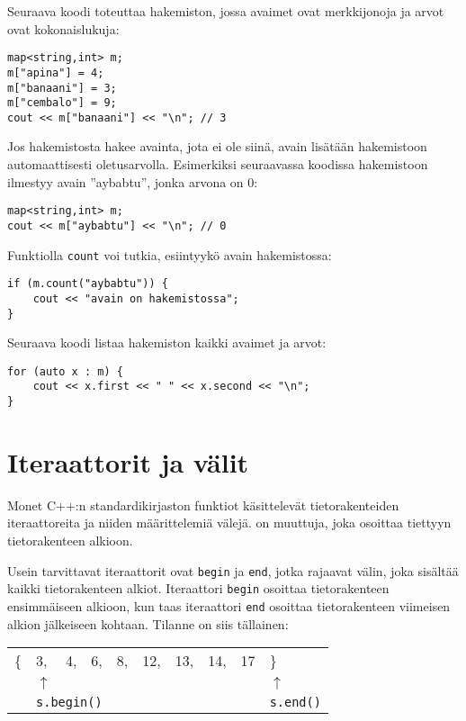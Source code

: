 Seuraava koodi toteuttaa hakemiston,
jossa avaimet ovat merkkijonoja ja
arvot ovat kokonaislukuja:

\begin{lstlisting}
map<string,int> m;
m["apina"] = 4;
m["banaani"] = 3;
m["cembalo"] = 9;
cout << m["banaani"] << "\n"; // 3
\end{lstlisting}

Jos hakemistosta hakee avainta,
jota ei ole siinä,
avain lisätään hakemistoon
automaattisesti oletusarvolla.
Esimerkiksi seuraavassa koodissa
hakemistoon ilmestyy avain ''aybabtu'',
jonka arvona on 0:

\begin{lstlisting}
map<string,int> m;
cout << m["aybabtu"] << "\n"; // 0
\end{lstlisting}
Funktiolla \texttt{count} voi
tutkia, esiintyykö avain hakemistossa:
\begin{lstlisting}
if (m.count("aybabtu")) {
    cout << "avain on hakemistossa";
}
\end{lstlisting}
Seuraava koodi listaa hakemiston
kaikki avaimet ja arvot:
\begin{lstlisting}
for (auto x : m) {
    cout << x.first << " " << x.second << "\n";
}
\end{lstlisting}

\section{Iteraattorit ja välit}


Monet C++:n standardikirjaston funktiot
käsittelevät tietorakenteiden iteraattoreita
ja niiden määrittelemiä välejä.
 on muuttuja,
joka osoittaa tiettyyn tietorakenteen alkioon.

Usein tarvittavat iteraattorit ovat \texttt{begin}
ja \texttt{end}, jotka rajaavat välin,
joka sisältää kaikki tietorakenteen alkiot.
Iteraattori \texttt{begin} osoittaa
tietorakenteen ensimmäiseen alkioon,
kun taas iteraattori \texttt{end} osoittaa
tietorakenteen viimeisen alkion jälkeiseen kohtaan.
Tilanne on siis tällainen:

\begin{center}
\begin{tabular}{llllllllll}
\{ & 3, & 4, & 6, & 8, & 12, & 13, & 14, & 17 & \} \\
& $\uparrow$ & & & & & & & & $\uparrow$ \\
& \multicolumn{3}{l}{\texttt{s.begin()}} & & & & & & \texttt{s.end()} \\
\end{tabular}
\end{center}


